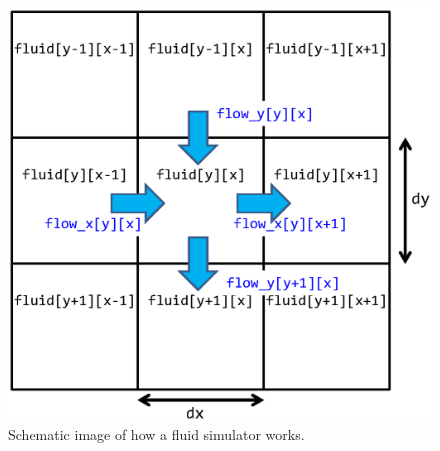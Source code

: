 \documentclass[twocolumn]{article}
\begin{document}
\begin{figure}
  \vspace{-5cm}
  \includegraphics[scale=0.4]{figure/fluid.eps}
  \caption {Schematic image of how a fluid simulator
    works. }\label{FigureFluidScheme}
\end{figure}
\end{document}
